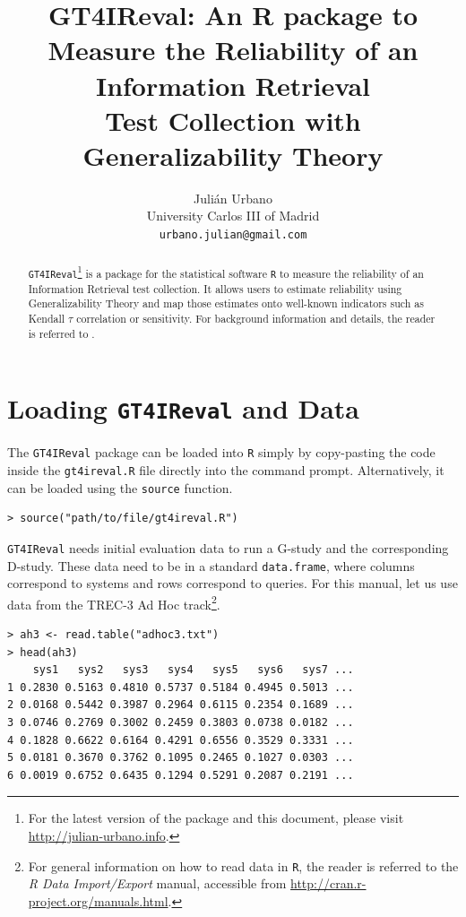 \documentclass[twoside]{article}
\begin{document}
\title{\textbf{GT4IReval: An R package to Measure the Reliability of an Information Retrieval\\Test Collection with Generalizability Theory}}
\author{Juli\'an Urbano\\University Carlos III of Madrid\\\texttt{urbano.julian@gmail.com}}
\maketitle

\begin{abstract}
\noindent\texttt{GT4IReval}\footnote{For the latest version of the package and this document, please visit \url{http://julian-urbano.info}.} is a package for the statistical software \texttt{R} to measure the reliability of an Information Retrieval test collection. It allows users to estimate reliability using Generalizability Theory and map those estimates onto well-known indicators such as Kendall $\tau$ correlation or sensitivity. For background information and details, the reader is referred to \cite{Urbano2013:measurement}.
\end{abstract}

\section{Loading \texttt{GT4IReval} and Data}

The \texttt{GT4IReval} package can be loaded into \texttt{R} simply by copy-pasting the code inside the \texttt{gt4ireval.R} file directly into the command prompt. Alternatively, it can be loaded using the \texttt{source} function.

{\small\begin{verbatim}
> source("path/to/file/gt4ireval.R")
\end{verbatim}}

\texttt{GT4IReval} needs initial evaluation data to run a G-study and the corresponding D-study. These data need to be in a standard \texttt{data.frame}, where columns correspond to systems and rows correspond to queries. For this manual, let us use data from the TREC-3 Ad Hoc track\footnote{For general information on how to read data in \texttt{R}, the reader is referred to the \textsl{R Data Import/Export} manual, accessible from \url{http://cran.r-project.org/manuals.html}.}.

{\small\begin{verbatim}
> ah3 <- read.table("adhoc3.txt")
> head(ah3)
    sys1   sys2   sys3   sys4   sys5   sys6   sys7 ...
1 0.2830 0.5163 0.4810 0.5737 0.5184 0.4945 0.5013 ...
2 0.0168 0.5442 0.3987 0.2964 0.6115 0.2354 0.1689 ...
3 0.0746 0.2769 0.3002 0.2459 0.3803 0.0738 0.0182 ...
4 0.1828 0.6622 0.6164 0.4291 0.6556 0.3529 0.3331 ...
5 0.0181 0.3670 0.3762 0.1095 0.2465 0.1027 0.0303 ...
6 0.0019 0.6752 0.6435 0.1294 0.5291 0.2087 0.2191 ...
\end{verbatim}}
\end{document}
